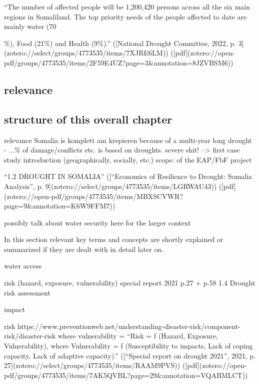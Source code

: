 “The number of affected people will be 1,200,420 persons across all the six main regions in Somaliland. The top priority needs of the people affected to date are mainly water (70{\%), Food (21\%) and Health (9\%).” ([National Drought Committee, 2022, p. 3](zotero://select/groups/4773535/items/7XJRE6LM)) ([pdf](zotero://open-pdf/groups/4773535/items/2F59E4UZ?page=3&annotation=8JZVBSM6))

\subsection{relevance}


\subsection{structure of this overall chapter}
relevance
Somalia is komplett am krepieren because of a multi-year long drought - ...\% of damage/conflicts etc. is based on droughts. severe shit! --> first case study introduction (geographically, socially, etc.) 
scope: of the EAP/FbF project

“1.2 DROUGHT IN SOMALIA” ([“Economics of Resilience to Drought: Somalia Analysis”, p. 9](zotero://select/groups/4773535/items/LGRWAU43)) ([pdf](zotero://open-pdf/groups/4773535/items/MBXSCVWR?page=9&annotation=K6W9FFM7))

possibly talk about water security here for the larger context


In this section relevant key terms and concepts are shortly explained or summarized if they are dealt with in detail later on.






water access



risk (hazard, exposure, vulnerability)
special report 2021 p.27 + p.58 1.4 Drought risk assessment

impact

risk
https://www.preventionweb.net/understanding-disaster-risk/component-risk/disaster-risk
where vulnerability = “Risk = ƒ (Hazard, Exposure, Vulnerability), where Vulnerability = ƒ (Susceptibility to impacts, Lack of coping capacity, Lack of adaptive capacity).” ([“Special report on drought 2021”, 2021, p. 27](zotero://select/groups/4773535/items/RAAM9PVS)) ([pdf](zotero://open-pdf/groups/4773535/items/7AK5QVBL?page=29&annotation=VQABMLCT))


}
